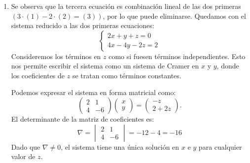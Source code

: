 \begin{enumerate}[label=\color{red}\textbf{\arabic*)}]
\item {} 

Se observa que la tercera ecuación es combinación lineal de las dos primeras $(3\cdot (1)-2\cdot (2)=(3))$, por lo que puede eliminarse. Quedamos con el sistema reducido a las dos primeras ecuaciones: \[
\begin{cases}
    2x+y+z=0\\
    4x-4y-2z=2
\end{cases}
\] 
Consideremos los términos en $z$ como si fuesen términos independientes. Esto nos permite escribir el sistema como un sistema de Cramer en  $x$ y $y$, donde los coeficientes de $z$ se tratan como términos constantes.

Podemos expresar el sistema en forma matricial como: \[
\begin{pmatrix} 
    2 & 1\\
    4 & -6
\end{pmatrix} \begin{pmatrix} 
x\\
y
\end{pmatrix} =\begin{pmatrix} 
-z\\
2+2z
\end{pmatrix} .
\] 
El determinante de la matriz de coeficientes es: \[
\nabla =\begin{vmatrix} 
    2 & 1\\
    4 & -6
\end{vmatrix} = -12-4=-16
\] 
Dado que $\nabla \neq 0$, el sistema tiene una única solución en $x$ e $y$ para cualquier valor de $z$.


\end{enumerate}
